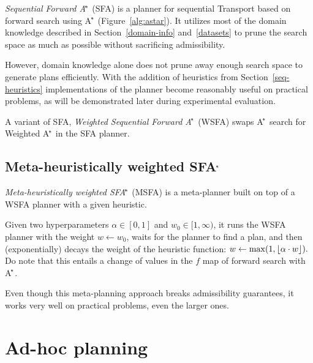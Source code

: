 \textit{Sequential Forward A$^{\kern-.15em*}$} (SFA) is a planner for sequential Transport based on forward search using A$^{\kern-.15em*}$ (Figure~\ref{alg:astar}).
It utilizes most of the domain knowledge described
in Section~\ref{domain-info} and~\ref{datasets}
to prune the search space as much as possible
without sacrificing admissibility.

However, domain knowledge alone does not
prune away enough search space to
generate plans efficiently.
With the addition of 
heuristics
from Section~\ref{seq-heuristics}
implementations of the planner become reasonably useful
on practical problems, as will be demonstrated
later during experimental evaluation.

A variant of SFA, 
\textit{Weighted Sequential Forward A$^{\kern-.15em*}$} (WSFA)
swaps A$^{\kern-.15em*}$ search for Weighted A$^{\kern-.15em*}$ in the SFA planner.

\subsection{Meta-heuristically weighted SFA$^{\kern-.15em*}$}\label{msfa}

\textit{Meta-heuristically weighted SFA$^{\kern-.15em*}$} (MSFA) is
a meta-planner built on top of a WSFA planner with
a given heuristic.

Given two hyperparameters $\alpha \in [0, 1]$ and $w_0 \in [1, \infty)$,
it runs the WSFA planner with the weight $w \gets w_0$,
waits for the planner to find a plan,
and then (exponentially) decays the 
weight of the heuristic function: $w \gets \max(1, \floor*{\alpha \cdot w}).$
Do note that this entails a change of values in the $f$ map
of forward search with A$^{\kern-.15em*}$.

Even though this meta-planning approach breaks
admissibility guarantees, it works very well on
practical problems, even the larger ones.



















\section{Ad-hoc planning}\label{ad-hoc}

